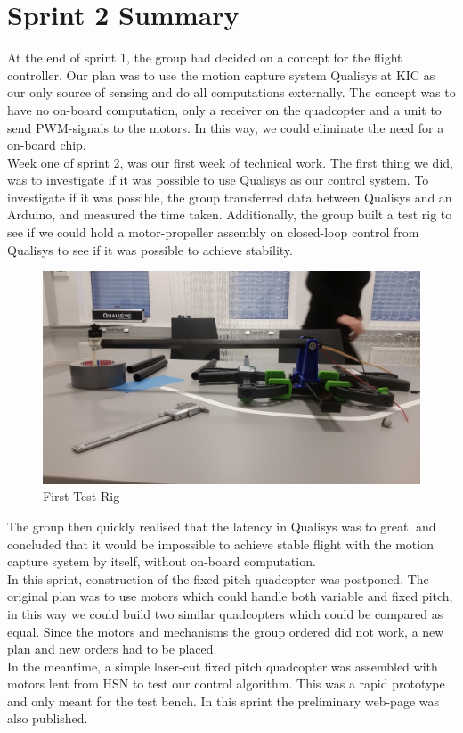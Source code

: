 \section{Sprint 2 Summary}

At the end of sprint 1, the group had decided on a concept for the flight controller. Our plan was to use the motion capture system Qualisys at KIC as our only source of sensing and do all computations externally. The concept was to have no on-board computation, only a receiver on the quadcopter and a unit to send PWM-signals to the motors. In this way, we could eliminate the need for a on-board chip. 
\\
Week one of sprint 2, was our first week of technical work. The first thing we did, was to investigate if it was possible to use Qualisys as our control system. To investigate if it was possible, the group transferred data between Qualisys and an Arduino, and measured the time taken. Additionally, the group built a test rig to see if we could hold a motor-propeller assembly on closed-loop control from Qualisys to see if it was possible to achieve stability.


\begin{figure}[h]
        \centering
        \includegraphics[width = 0.5
        \textwidth]{VAPIQ-PICTURES//TestRig(arm)1}
         \caption{First Test Rig}
       
    \end{figure}   
\noindent
The group then quickly realised that the latency in Qualisys was to great, and concluded that it would be impossible to achieve stable flight with the motion capture system by itself, without on-board computation.
\\
In this sprint, construction of the fixed pitch quadcopter was postponed. The original plan was to use motors which could handle both variable and fixed pitch, in this way we could build two similar quadcopters which could be compared as equal. Since the motors and mechanisms the group ordered did not work, a new plan and new orders had to be placed. 
\\
In the meantime, a simple laser-cut fixed pitch quadcopter was assembled with motors lent from HSN to test our control algorithm. This was a rapid prototype and only meant for the test bench. In this sprint the preliminary web-page was also published.

